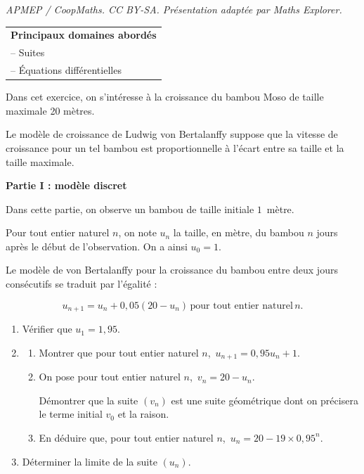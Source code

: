 \documentclass[10pt]{article}
\begin{document}
\noindent\textit{APMEP / CoopMaths. CC BY-SA. Présentation adaptée par Maths Explorer.}\par\medskip
\medskip

\begin{tabular}{|l|}\hline
\textbf{Principaux domaines abordés}\\
-- Suites\\
-- Équations différentielles\\ \hline
\end{tabular}

\medskip

Dans cet exercice, on s'intéresse à la croissance du bambou Moso de taille maximale 20 mètres. 

Le modèle de croissance de Ludwig von Bertalanffy suppose que la vitesse de croissance pour un tel bambou est proportionnelle à l'écart entre sa taille et la taille maximale.

\bigskip

\textbf{Partie I : modèle discret}

\medskip

Dans cette partie, on observe un bambou de taille initiale $1$~mètre.

Pour tout entier naturel $n$, on note $u_n$ la taille, en mètre, du bambou $n$ jours après le début de l'observation. On a ainsi $u_0 = 1$.

Le modèle de von Bertalanffy pour la croissance du bambou entre deux jours consécutifs se traduit par l'égalité :

\[u_{n+1} = u_n + 0,05\left(20 - u_n\right)\,  \text{pour tout entier naturel}\,  n.\]

\medskip

\begin{enumerate}
\item Vérifier que $u_1 = 1,95$.
\item 
	\begin{enumerate}
		\item Montrer que pour tout entier naturel $n$,\,  $u_{n+1} = 0,95u_n + 1$.
		\item On pose pour tout entier naturel $n$,\,  $v_n = 20 - u_n$. 
		
Démontrer que la suite $\left(v_n\right)$ est une suite géométrique dont on précisera le terme initial $v_0$ et la raison.
		\item En déduire que, pour tout entier naturel $n$,\,  $u_n = 20 - 19 \times 0,95^n$.
	\end{enumerate}
\item Déterminer la limite de la suite $\left(u_n\right)$.
\end{enumerate}
\end{document}
